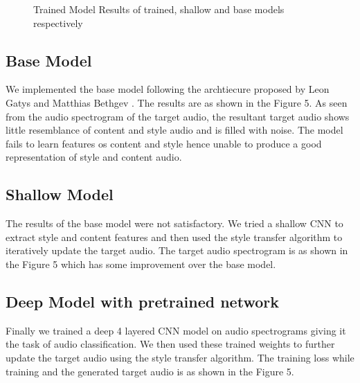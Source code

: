 \documentclass[10pt,twocolumn,letterpaper]{article}
\begin{document}
\begin{figure}
\begin{center}
\end{center}
   \caption{Trained Model Results of trained, shallow and base models respectively}
\label{fig:short}
\end{figure}

\subsection{Base Model}
We implemented the base model following the archtiecure proposed by Leon Gatys and Matthias Bethgev \cite{Authors00001}. The results are as shown in the Figure 5.
As seen from the audio spectrogram of the target audio, the resultant target audio shows little resemblance of content and style audio and is filled with noise. The model fails to learn features os content and style hence unable to produce a good representation of style and content audio.


\subsection{Shallow Model}
The results of the base model were not satisfactory. We tried a shallow CNN to extract style and content features and then used the style transfer algorithm to iteratively update the target audio. The target audio spectrogram is as shown in the Figure 5 which has some improvement over the base model.


\subsection{Deep Model with pretrained network}
Finally we trained a deep 4 layered CNN model on audio spectrograms giving it the task of audio classification. We then used these trained weights to further update the target audio using the style transfer algorithm. The training loss while training and the generated target audio is as shown in the Figure 5.
\end{document}
